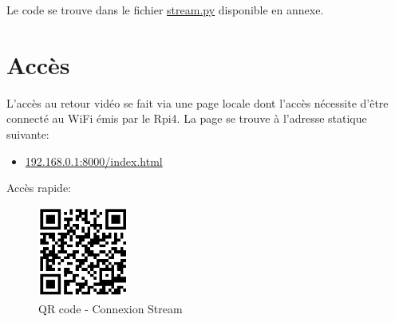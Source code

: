 Le code se trouve dans le fichier \underline{stream.py} disponible en annexe.
\newpage
\section{Accès}
L'accès au retour vidéo se fait via une page locale dont l'accès nécessite d'être connecté au WiFi émis par le Rpi4.
La page se trouve à l'adresse statique suivante:
\begin{itemize}
    \item  \url{192.168.0.1:8000/index.html}
\end{itemize}
Accès rapide:

\begin{figure}[H]
    \centering
    \includegraphics[width=3cm]{assets/figures/acces_stream.PNG}
    \caption{QR code - Connexion Stream}
\end{figure}